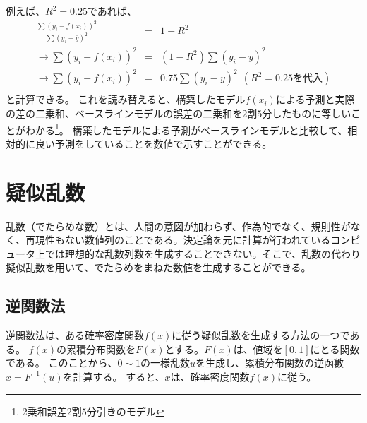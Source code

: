 例えば、$R^2=0.25$であれば、
\begin{eqnarray*}
 \frac{\sum (y_i-f(x_i))^2}{\sum (y_i-\bar{y})^2} &=& 1-R^2 \\
 \rightarrow \sum (y_i-f(x_i))^2 &=& (1-R^2)\sum (y_i-\bar{y})^2 \\
 \rightarrow \sum (y_i-f(x_i))^2 &=& 0.75\sum (y_i-\bar{y})^2 \ \ (R^2 = 0.25を代入) \\
\end{eqnarray*}
と計算できる。
これを読み替えると、構築したモデル$f(x_i)$による予測と実際の差の二乗和、ベースラインモデルの誤差の二乗和を$2$割$5$分したものに等しいことがわかる\footnote{2乗和誤差$2$割$5$分引きのモデル}。
構築したモデルによる予測がベースラインモデルと比較して、相対的に良い予測をしていることを数値で示すことができる。


\section{疑似乱数}
乱数（でたらめな数）とは、人間の意図が加わらず、作為的でなく、規則性がなく、再現性もない数値列のことである。決定論を元に計算が行われているコンピュータ上では理想的な乱数列数を生成することできない。そこで、乱数の代わり擬似乱数を用いて、でたらめをまねた数値を生成することができる。

\subsection{逆関数法}
逆関数法は、ある確率密度関数$f(x)$に従う疑似乱数を生成する方法の一つである。
$f(x)$の累積分布関数を$F(x)$とする。$F(x)$は、値域を$[0,1]$にとる関数である。
このことから、$0\sim 1$の一様乱数$u$を生成し、累積分布関数の逆函數$x=F^{-1}(u)$を計算する。
すると、$x$は、確率密度関数$f(x)$に従う。

